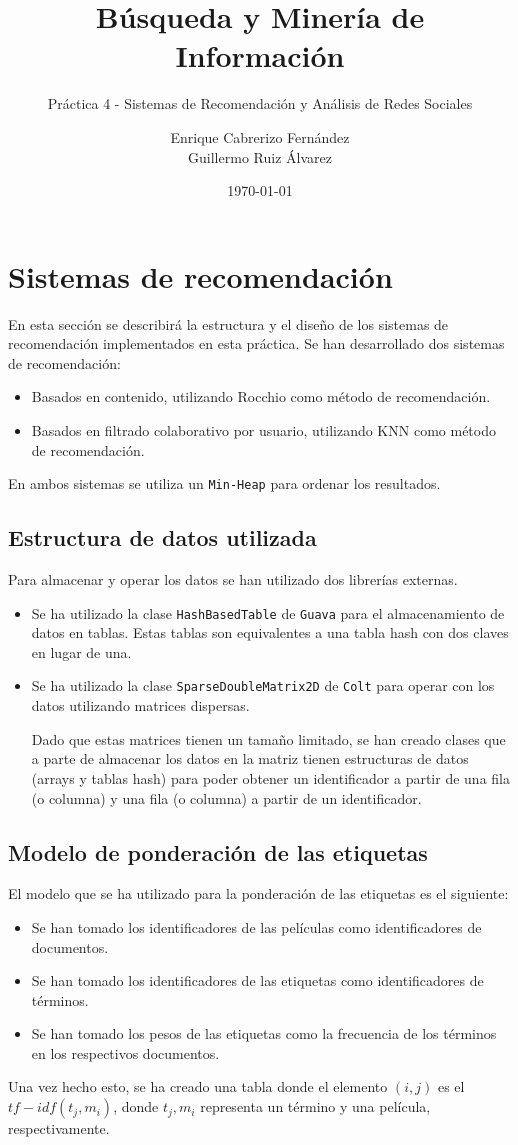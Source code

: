\documentclass[spanish]{assignment}
\title{Búsqueda y Minería de Información}
\subtitle{Práctica 4 - Sistemas de Recomendación y Análisis de Redes Sociales}
\author{Enrique Cabrerizo Fernández\\ Guillermo Ruiz Álvarez}
\date{\today}
\begin{document}
	\makepre
	\section{Sistemas de recomendación}
	En esta sección se describirá la estructura y el diseño de los sistemas de recomendación implementados en esta práctica.
	Se han desarrollado dos sistemas de recomendación:
	\begin{itemize}
		\item Basados en contenido, utilizando Rocchio como método de recomendación.
		\item Basados en filtrado colaborativo por usuario, utilizando KNN como método de recomendación. 
	\end{itemize}
	En ambos sistemas se utiliza un \texttt{Min-Heap} para ordenar los resultados.
	
	\subsection{Estructura de datos utilizada}
	Para almacenar y operar los datos se han utilizado dos librerías externas.
	\begin{itemize}
		\item Se ha utilizado la clase \texttt{HashBasedTable} de \texttt{Guava} para el almacenamiento
		de datos en tablas. Estas tablas son equivalentes a una tabla hash con dos claves en lugar de una.
		\item Se ha utilizado la clase \texttt{SparseDoubleMatrix2D} de \texttt{Colt} para operar con los datos utilizando matrices dispersas. 
		
		Dado que estas matrices tienen un tamaño limitado, se han creado clases que a parte de almacenar los datos en la matriz tienen estructuras de datos (arrays y tablas hash) para poder obtener un identificador a partir de una fila (o columna) y una fila (o columna) a partir de un identificador.
	\end{itemize}
	
	\subsection{Modelo de ponderación de las etiquetas}
	El modelo que se ha utilizado para la ponderación de las etiquetas es el siguiente:
	\begin{itemize}
		\item Se han tomado los identificadores de las películas como identificadores de documentos.
		\item Se han tomado los identificadores de las etiquetas como identificadores de términos.
		\item Se han tomado los pesos de las etiquetas como la frecuencia de los términos en los respectivos documentos.
	\end{itemize}
	Una vez hecho esto, se ha creado una tabla donde el elemento $(i,j)$ es el $tf-idf(t_j, m_i)$, donde $t_j, m_i$ representa un término y una película, respectivamente.
	
\end{document}
